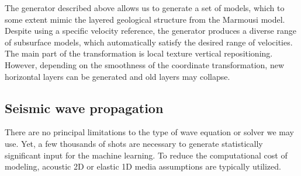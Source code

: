 \documentclass[paper,twocolomn]{geophysics}
\begin{document}

%



The generator described above allows us to generate a set of models, which to some extent mimic the layered geological structure from the Marmousi model. Despite using a specific velocity reference, the generator produces a diverse range of subsurface models, which automatically satisfy the desired range of velocities. The main part of the transformation is local texture vertical repositioning. However, depending on the smoothness of the coordinate transformation, new horizontal layers can be generated and old layers may collapse.

\subsection{Seismic wave propagation}
There are no principal limitations to the type of wave equation or solver we may use. Yet, a few thousands of shots are necessary to generate statistically significant input for the machine learning. To reduce the computational cost of modeling, acoustic 2D \citep{polo2018,ovcharenko2018,ovcharenko2019deep, li2019} or elastic 1D \citep[e.g.][]{zheng2019} media assumptions are typically utilized.
\end{document}
